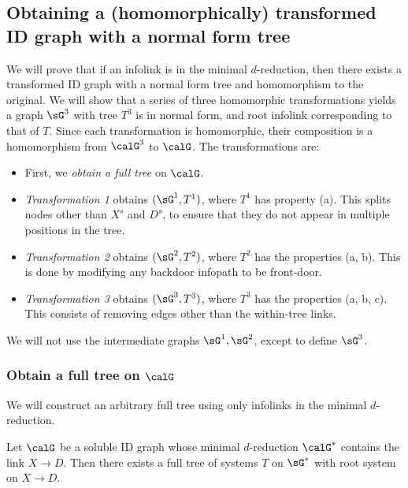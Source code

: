 
\subsection{Obtaining a (homomorphically) transformed ID graph with a normal form tree} \label{sec:cidhom-graph-splitting} 

We will prove that
if an infolink is in the minimal $d$-reduction, then
there exists a transformed ID graph with a normal form tree and homomorphism to the original.
We will show that a series of three homomorphic transformations %
yields a graph $\sG^3$ with tree $T^3$ is in normal form, and
root infolink corresponding to that of $T$.
Since each transformation is homomorphic, 
their composition is a
homomorphism from $\calG^3$ to $\calG$.
The transformations are:~

\begin{itemize}
    \item First, we \emph{obtain a full tree} on $\calG$.
    \item \emph{Transformation 1} obtains
    $(\sG^1,T^1)$, where $T^1$ has property (a).
    This splits nodes other than $X^s$ and $D^s$, to ensure that 
    they do not appear in multiple positions in the tree.~
    
    \item \emph{Transformation 2} obtains 
    $(\sG^2,T^2)$, where $T^2$ has the properties (a, b).
    This is done by modifying any backdoor infopath to be front-door.
    
    \item \emph{Transformation 3} obtains 
    $(\sG^3,T^3)$, where $T^3$ has the properties (a, b, c).
    This consists of removing edges other than the within-tree links.
\end{itemize}
We will not use the intermediate graphs $\sG^1,\sG^2$, except to define $\sG^3$.

\subsubsection{Obtain a full tree on $\calG$}
We will construct an arbitrary full tree using only infolinks in the minimal $d$-reduction.

\begin{lemma}
\label{le:m3.1-existence-of-complete-tree-of-systems}
Let $\calG$ be a soluble ID graph whose minimal $d$-reduction $\calG^*$ contains the link $X \to D$.
Then there exists a full tree of systems $T$ on $\sG^*$ with root system on $X \to D$.
\end{lemma}

